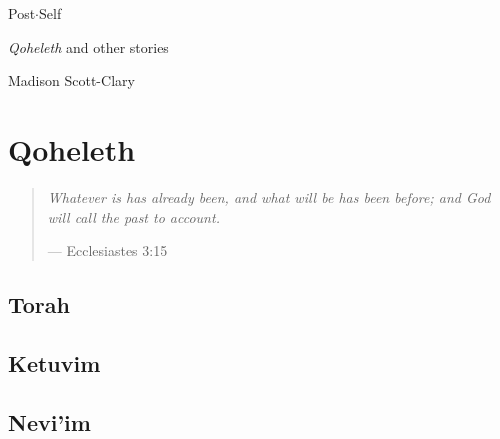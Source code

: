\documentclass[11pt]{memoir}
\begin{document}
  \frontmatter

  

  \pagestyle{plain}

  \doublespacing

  \begin{flushright}
    \null
    \vfill
    {\Huge\DisplayFont Post$\cdot$Self}

    {\Large\DisplayFont \emph{Qoheleth} and other stories}

    \vfill

    {\Large\DisplayFont Madison Scott-Clary}
  \end{flushright}
  \thispagestyle{empty}

  \newpage

  

  \tableofcontents*
  \newpage
  \null
  \cleardoublepage

  \onehalfspacing


  \mainmatter

  \pagestyle{ourbook}

  \cleardoublepage
  \part*{Qoheleth}
  \null
  \thispagestyle{empty}
  \vfill
  \begin{quote}
    \emph{Whatever is has already been, and what will be has been before; and God will call the past to account.}

    --- Ecclesiastes 3:15
  \end{quote}
  \vfill
  \chapter{Torah}
  

  \chapter{Ketuvim}
  

  \chapter{Nevi'im}
  
\end{document}
